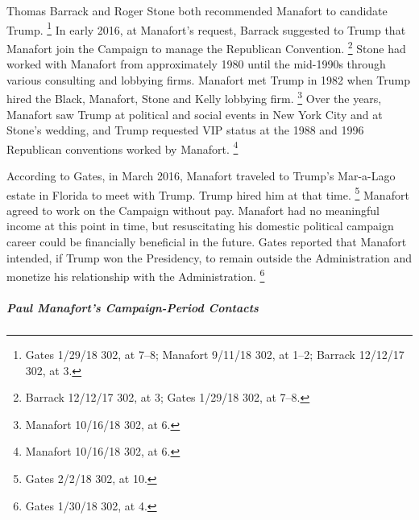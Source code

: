 Thomas Barrack and Roger Stone both recommended Manafort to candidate Trump.%
\footnote{Gates 1/29/18 302, at 7--8;
Manafort 9/11/18 302, at 1--2;
Barrack 12/12/17 302, at 3.}
In early 2016, at Manafort's request, Barrack suggested to Trump that Manafort join the Campaign to manage the Republican Convention.%
\footnote{Barrack 12/12/17 302, at 3;
Gates 1/29/18 302, at 7--8.}
Stone had worked with Manafort from approximately 1980 until the mid-1990s through various consulting and lobbying firms.
Manafort met Trump in 1982 when Trump hired the Black, Manafort, Stone and Kelly lobbying firm.%
\footnote{Manafort 10/16/18 302, at 6.}
Over the years, Manafort saw Trump at political and social events in New York City and at Stone's wedding, and Trump requested VIP status at the 1988 and 1996 Republican conventions worked by Manafort.%
\footnote{Manafort 10/16/18 302, at 6.}

According to Gates, in March 2016, Manafort traveled to Trump's Mar-a-Lago estate in Florida to meet with Trump.
Trump hired him at that time.%
\footnote{Gates 2/2/18 302, at 10.}
Manafort agreed to work on the Campaign without pay.
Manafort had no meaningful income at this point in time, but resuscitating his domestic political campaign career could be financially beneficial in the future.
Gates reported that Manafort intended, if Trump won the Presidency, to remain outside the Administration and monetize his relationship with the Administration.%
\footnote{Gates 1/30/18 302, at 4.}

\subparagraph{Paul Manafort's Campaign-Period Contacts}

